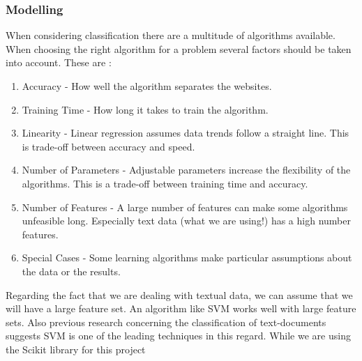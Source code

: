 \subsubsection{Modelling}
When considering classification there are a multitude of algorithms available. When choosing the right algorithm for a problem several factors should be taken into account. These are \cite{MLCheatSheet}:
    \begin{enumerate}
        \item Accuracy - How well the algorithm separates the websites.
        \item Training Time - How long it takes to train the algorithm.
        \item Linearity - Linear regression assumes data trends follow a straight line. This is trade-off between accuracy and speed.
        \item Number of Parameters - Adjustable parameters increase the flexibility of the algorithms. This is a trade-off between training time and accuracy.
        \item Number of Features - A large number of features can make some algorithms unfeasible long. Especially text data (what we are using!) has a high number features.
        \item Special Cases - Some learning algorithms make particular assumptions about the data or the results.
    \end{enumerate}

Regarding the fact that we are dealing with textual data, we can assume that we will have a large feature set. An algorithm like SVM \cite{ml_text} works well with large feature sets\cite{MLCheatSheet}.
Also previous research concerning the classification of text-documents suggests SVM is one of the leading techniques in this regard\cite{ml_text}. While we are using the Scikit library for this project 


